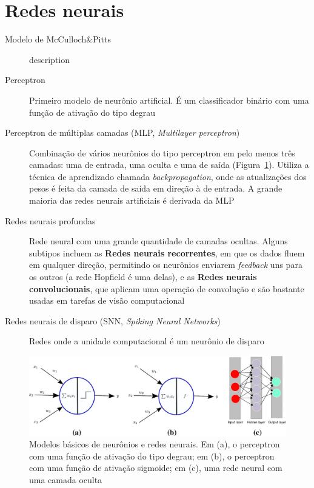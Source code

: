 \section{Redes neurais}\label{sec:redesneurais}
\begin{description}
	\item[Modelo de McCulloch\&Pitts] description
	\item[Perceptron] Primeiro modelo de neurônio artificial. É um classificador binário com uma função de ativação do tipo degrau
	\item[Perceptron de múltiplas camadas (MLP, \textit{Multilayer perceptron})] Combinação de vários neurônios do tipo perceptron em pelo menos três camadas: uma de entrada, uma oculta e uma de saída (Figura~\ref*{fig:modelosmlp}). Utiliza a técnica de aprendizado chamada \textit{backpropagation}, onde as atualizações dos pesos é feita da camada de saída em direção à de entrada. A grande maioria das redes neurais artificiais é derivada da MLP
	\item[Redes neurais profundas] Rede neural com uma grande quantidade de camadas ocultas. Alguns subtipos incluem as \textbf{Redes neurais recorrentes}, em que os dados fluem em qualquer direção, permitindo os neurônios enviarem \textit{feedback} uns para os outros (a rede Hopfield é uma delas), e as \textbf{Redes neurais convolucionais}, que aplicam uma operação de convolução e são bastante usadas em tarefas de visão computacional
	\item[Redes neurais de disparo (SNN, \textit{Spiking Neural Networks})] Redes onde a unidade computacional é um neurônio de disparo
\end{description}

\begin{figure}[htb!]
	\centering
	\caption[Modelos básicos de neurônios e redes neurais]{Modelos básicos de neurônios e redes neurais. Em (a), o perceptron com uma função de ativação do tipo degrau; em (b), o perceptron com uma função de ativação sigmoide; em (c), uma rede neural com uma camada oculta}
	\label{fig:modelosmlp}
	\includegraphics[width=0.9\linewidth]{figs/modelos_mlp}
\end{figure}


